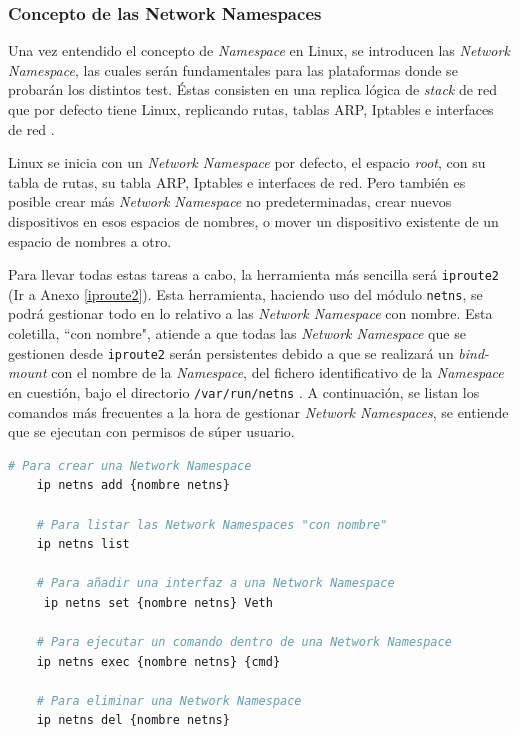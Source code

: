 \subsubsection{Concepto de las Network Namespaces}

Una vez entendido el concepto de \textit{Namespace} en Linux, se introducen las \textit{Network Namespace}, las cuales serán fundamentales para las plataformas donde se probarán los distintos test. Éstas consisten en una replica lógica de \textit{stack} de red que por defecto tiene Linux, replicando rutas, tablas ARP, Iptables e interfaces de red \cite{netns}. \\
\par
Linux se inicia con un \textit{Network Namespace} por defecto, el espacio \textit{root}, con su tabla de rutas, su tabla ARP,  Iptables e interfaces de red. Pero también es posible crear más \textit{Network Namespace} no predeterminadas,  crear nuevos dispositivos en esos espacios de nombres, o mover un dispositivo existente de un espacio de nombres a otro. \\
\par
Para llevar todas estas tareas a cabo, la herramienta más sencilla será \texttt{iproute2} (Ir a Anexo \ref{iproute2}). Esta herramienta, haciendo uso del módulo \texttt{netns}, se podrá gestionar todo en lo relativo a las \textit{Network Namespace} con nombre. Esta coletilla, ``con nombre", atiende a que todas las \textit{Network Namespace} que se gestionen desde \texttt{iproute2} serán persistentes debido a que se realizará un \textit{bind-mount} con el nombre de la \textit{Namespace}, del fichero identificativo de la \textit{Namespace} en cuestión, bajo el directorio \texttt{/var/run/netns} . A continuación, se listan los comandos más frecuentes a la hora de gestionar \textit{Network Namespaces}, se entiende que se ejecutan con permisos de súper usuario.

\begin{lstlisting}[language= bash, style=Consola, caption={Comandos útiles con iproute2 - Netns},label=code:iproute2_ns_use]
    # Para crear una Network Namespace
    ip netns add {nombre netns}
    
    # Para listar las Network Namespaces "con nombre"
    ip netns list
    
    # Para añadir una interfaz a una Network Namespace
     ip netns set {nombre netns} Veth
    
    # Para ejecutar un comando dentro de una Network Namespace
    ip netns exec {nombre netns} {cmd}
    
    # Para eliminar una Network Namespace
    ip netns del {nombre netns}
    
\end{lstlisting}

